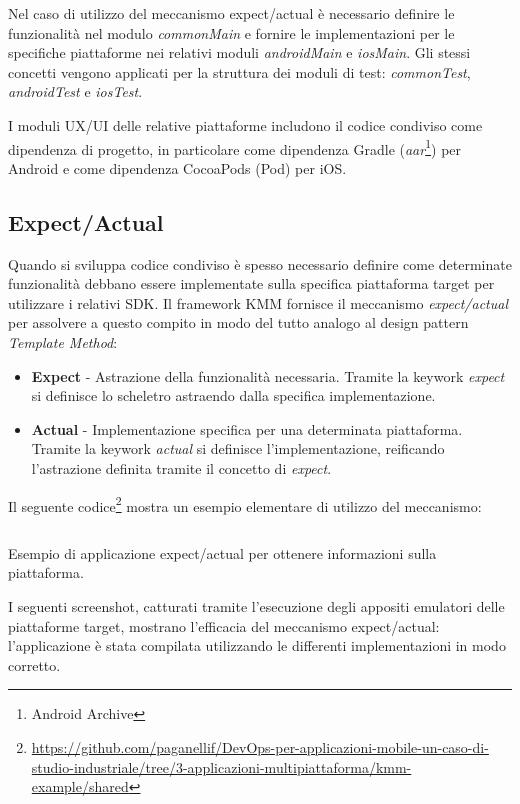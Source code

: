 Nel caso di utilizzo del meccanismo expect/actual è necessario definire le funzionalità nel modulo \textit{commonMain} e fornire le implementazioni per le specifiche piattaforme nei relativi moduli \textit{androidMain} e \textit{iosMain}. Gli stessi concetti vengono applicati per la struttura dei moduli di test: \textit{commonTest}, \textit{androidTest} e \textit{iosTest}.

I moduli UX/UI delle relative piattaforme includono il codice condiviso come dipendenza di progetto, in particolare come dipendenza Gradle (\textit{aar}\footnote{Android Archive}) per Android e come dipendenza CocoaPods (Pod) per iOS.

\subsection{Expect/Actual}
Quando si sviluppa codice condiviso è spesso necessario definire come determinate funzionalità debbano essere implementate sulla specifica piattaforma target per utilizzare i relativi SDK. Il framework KMM fornisce il meccanismo \textit{expect/actual} per assolvere a questo compito in modo del tutto analogo al design pattern \textit{Template Method}:
\begin{itemize}
    \item \textbf{Expect} - Astrazione della funzionalità necessaria. Tramite la keywork \textit{expect} si definisce lo scheletro astraendo dalla specifica implementazione.
    \item \textbf{Actual} - Implementazione specifica per una determinata piattaforma. Tramite la keywork \textit{actual} si definisce l'implementazione, reificando l'astrazione definita tramite il concetto di \textit{expect}.
\end{itemize}

Il seguente codice\footnote{\href{https://github.com/paganellif/DevOps-per-applicazioni-mobile-un-caso-di-studio-industriale/tree/3-applicazioni-multipiattaforma/kmm-example/shared}{https://github.com/paganellif/DevOps-per-applicazioni-mobile-un-caso-di-studio-industriale/tree/3-applicazioni-multipiattaforma/kmm-example/shared}} mostra un esempio elementare di utilizzo del meccanismo:

\begin{listing}[H]
    \inputminted{kotlin}{code/3-expectactual}
    \caption{Esempio di applicazione expect/actual per ottenere informazioni sulla piattaforma.}
\end{listing}

I seguenti screenshot, catturati tramite l'esecuzione degli appositi emulatori delle piattaforme target, mostrano l'efficacia del meccanismo expect/actual: l'applicazione è stata compilata utilizzando le differenti implementazioni in modo corretto.

